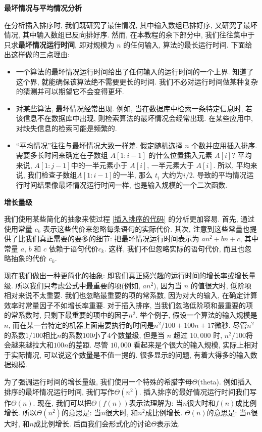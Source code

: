 \documentclass[oneside,10pt,fontset=none]{ctexbook}
\numberwithin{definition}{chapter}
\numberwithin{theorem}{chapter}
\numberwithin{lemma}{chapter}
\begin{document}
\textbf{最坏情况与平均情况分析}

在分析插入排序时, 我们既研究了最佳情况, 其中输入数组已排好序, 又研究了最坏情况, 其中输入数组已反向排好序. 然而, 在本教程的余下部分中, 我们往往集中于只求\textbf{最坏情况运行时间}, 即对规模为 $n$ 的任何输入, 算法的最长运行时间. 下面给出这样做的三点理由:

\begin{itemize}
    \item 一个算法的最坏情况运行时间给出了任何输入的运行时间的一个上界. 知道了这个界, 就能确保该算法绝不需要更长的时间. 我们不必对运行时间做某种复杂的猜测并可以期望它不会变得更坏.
    \item 对某些算法, 最坏情况经常出现. 例如, 当在数据库中检索一条特定信息时, 若该信息不在数据库中出现, 则检索算法的最坏情况会经常出现. 在某些应用中, 对缺失信息的检索可能是频繁的.
    \item ``平均情况''往往与最坏情况大致一样差. 假定随机选择 $n$ 个数并应用插入排序. 需要多长时间来确定在子数组 $A[1:i-1]$ 的什么位置插入元素 $A[i]$? 平均来说, $A[1:j-1]$中的一半元素小于 $A[i]$, 一半元素大于 $A[i]$. 所以, 平均来说, 我们检查子数组$A[1:i-1]$的一半, 那么 $t_i$ 大约为$i/2$. 导致的平均情况运行时间结果像最坏情况运行时间一样, 也是输入规模的一个二次函数.
\end{itemize}

\textbf{增长量级}

我们使用某些简化的抽象来使过程 \ref{插入排序的代码} 的分析更加容易. 首先, 通过使用常量 $c_k$ 表示这些代价来忽略每条语句的实际代价. 其次, 注意到这些常量也提供了比我们真正需要的要多的细节: 把最坏情况运行时间表示为 $an^2+bn+c$, 其中常量 $a$, $b$ 和 $c$ 依赖于语句代价$c_k$. 这样, 我们不但忽略实际的语句代价, 而且也忽略抽象的代价 $c_k$.

现在我们做出一种更简化的抽象: 即我们真正感兴趣的运行时间的增长率或增长量级. 所以我们只考虑公式中最重要的项(例如, $an^2$), 因为当 $n$ 的值很大时, 低阶项相对来说不太重要. 我们也忽略最重要的项的常系数, 因为对大的输入, 在确定计算效率时常量因子不如增长率重要. 对于插入排序, 当我们忽略低阶项和最重要的项的常系数时, 只剩下最重要的项中的因子$n^2$. 举个例子, 假设一个算法的输入规模是$n$, 而在某一台特定的机器上面需要执行的时间是$n^2/100+100n+17$微秒. 尽管$n^2$的系数$1/100$相比$n$的系数$100$小了4个数量级, 但是当 $n$ 超过 $10,000$ 时, $n^2/100$将会越来越拉大和$100n$的差距. 尽管 $10,000$ 看起来是个很大的输入规模, 实际上相对于实际情况, 可以说这个数量是不值一提的. 很多显示的问题, 有着大得多的输入数据规模.

为了强调运行时间的增长量级, 我们使用一个特殊的希腊字母$\Theta$(theta). 例如插入排序的最坏情况运行时间, 我们写作$\Theta(n^2)$. 插入排序的最好情况运行时间我们写作$\Theta(n)$. 现在, 我们可以把$\Theta(f(n))$表示法理解为: 当$n$很大时和$f(n)$成比例增长. 所以$\Theta(n^2)$的意思是: 当$n$很大时, 和$n^2$成比例增长. $\Theta(n)$的意思是: 当$n$很大时, 和$n$成比例增长. 后面我们会形式化的讨论$\Theta$表示法.
\end{document}
